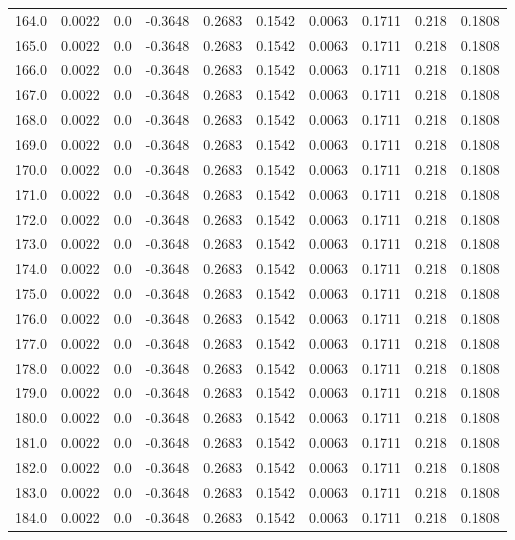 \begin{longtable}{lrrrrrrrrr}
164.0 & 0.0022 & 0.0 & -0.3648 & 0.2683 & 0.1542 & 0.0063 & 0.1711 & 0.218 & 0.1808 \\
165.0 & 0.0022 & 0.0 & -0.3648 & 0.2683 & 0.1542 & 0.0063 & 0.1711 & 0.218 & 0.1808 \\
166.0 & 0.0022 & 0.0 & -0.3648 & 0.2683 & 0.1542 & 0.0063 & 0.1711 & 0.218 & 0.1808 \\
167.0 & 0.0022 & 0.0 & -0.3648 & 0.2683 & 0.1542 & 0.0063 & 0.1711 & 0.218 & 0.1808 \\
168.0 & 0.0022 & 0.0 & -0.3648 & 0.2683 & 0.1542 & 0.0063 & 0.1711 & 0.218 & 0.1808 \\
169.0 & 0.0022 & 0.0 & -0.3648 & 0.2683 & 0.1542 & 0.0063 & 0.1711 & 0.218 & 0.1808 \\
170.0 & 0.0022 & 0.0 & -0.3648 & 0.2683 & 0.1542 & 0.0063 & 0.1711 & 0.218 & 0.1808 \\
171.0 & 0.0022 & 0.0 & -0.3648 & 0.2683 & 0.1542 & 0.0063 & 0.1711 & 0.218 & 0.1808 \\
172.0 & 0.0022 & 0.0 & -0.3648 & 0.2683 & 0.1542 & 0.0063 & 0.1711 & 0.218 & 0.1808 \\
173.0 & 0.0022 & 0.0 & -0.3648 & 0.2683 & 0.1542 & 0.0063 & 0.1711 & 0.218 & 0.1808 \\
174.0 & 0.0022 & 0.0 & -0.3648 & 0.2683 & 0.1542 & 0.0063 & 0.1711 & 0.218 & 0.1808 \\
175.0 & 0.0022 & 0.0 & -0.3648 & 0.2683 & 0.1542 & 0.0063 & 0.1711 & 0.218 & 0.1808 \\
176.0 & 0.0022 & 0.0 & -0.3648 & 0.2683 & 0.1542 & 0.0063 & 0.1711 & 0.218 & 0.1808 \\
177.0 & 0.0022 & 0.0 & -0.3648 & 0.2683 & 0.1542 & 0.0063 & 0.1711 & 0.218 & 0.1808 \\
178.0 & 0.0022 & 0.0 & -0.3648 & 0.2683 & 0.1542 & 0.0063 & 0.1711 & 0.218 & 0.1808 \\
179.0 & 0.0022 & 0.0 & -0.3648 & 0.2683 & 0.1542 & 0.0063 & 0.1711 & 0.218 & 0.1808 \\
180.0 & 0.0022 & 0.0 & -0.3648 & 0.2683 & 0.1542 & 0.0063 & 0.1711 & 0.218 & 0.1808 \\
181.0 & 0.0022 & 0.0 & -0.3648 & 0.2683 & 0.1542 & 0.0063 & 0.1711 & 0.218 & 0.1808 \\
182.0 & 0.0022 & 0.0 & -0.3648 & 0.2683 & 0.1542 & 0.0063 & 0.1711 & 0.218 & 0.1808 \\
183.0 & 0.0022 & 0.0 & -0.3648 & 0.2683 & 0.1542 & 0.0063 & 0.1711 & 0.218 & 0.1808 \\
184.0 & 0.0022 & 0.0 & -0.3648 & 0.2683 & 0.1542 & 0.0063 & 0.1711 & 0.218 & 0.1808 \\

\end{longtable}
